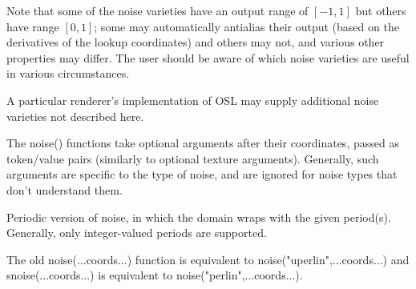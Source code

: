 \documentclass[11pt,letterpaper]{book}
\begin{document}
Note that some of the noise varieties have an output range of $[-1,1]$
but others have range $[0,1]$; some may automatically antialias their
output (based on the derivatives of the lookup coordinates) and others
may not, and various other properties may differ.  The user should be
aware of which noise varieties are useful in various circumstances.

A particular renderer's implementation of OSL may supply additional
noise varieties not described here.

The {\cf noise()} functions take optional arguments after their
coordinates, passed as token/value pairs (similarly to optional texture
arguments).  Generally, such arguments are specific to the type of
noise, and are ignored for noise types that don't understand them.

\apiend




Periodic version of {\cf noise}, in which the domain wraps with the given
period(s).  Generally, only integer-valued periods are supported.
\apiend





The old {\cf noise(...coords...)} function is equivalent to
{\cf noise("uperlin",...coords...)} and {\cf snoise(...coords...)}
is equivalent to {\cf noise("perlin",...coords...)}.
\apiend
\end{document}
